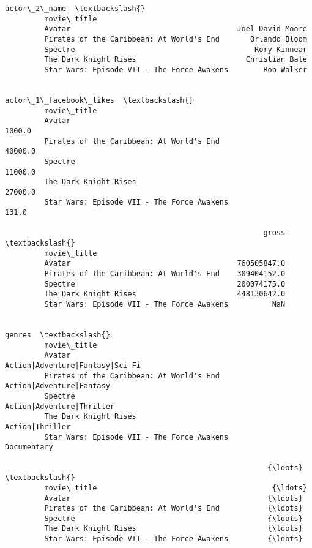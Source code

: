 \documentclass[11pt]{article}
\begin{document}
\begin{Verbatim}[commandchars=\\\{\}]
                                                         actor\_2\_name  \textbackslash{}
         movie\_title                                                    
         Avatar                                      Joel David Moore   
         Pirates of the Caribbean: At World's End       Orlando Bloom   
         Spectre                                         Rory Kinnear   
         The Dark Knight Rises                         Christian Bale   
         Star Wars: Episode VII - The Force Awakens        Rob Walker   
         
                                                     actor\_1\_facebook\_likes  \textbackslash{}
         movie\_title                                                          
         Avatar                                                      1000.0   
         Pirates of the Caribbean: At World's End                   40000.0   
         Spectre                                                    11000.0   
         The Dark Knight Rises                                      27000.0   
         Star Wars: Episode VII - The Force Awakens                   131.0   
         
                                                           gross  \textbackslash{}
         movie\_title                                               
         Avatar                                      760505847.0   
         Pirates of the Caribbean: At World's End    309404152.0   
         Spectre                                     200074175.0   
         The Dark Knight Rises                       448130642.0   
         Star Wars: Episode VII - The Force Awakens          NaN   
         
                                                                              genres  \textbackslash{}
         movie\_title                                                                   
         Avatar                                      Action|Adventure|Fantasy|Sci-Fi   
         Pirates of the Caribbean: At World's End           Action|Adventure|Fantasy   
         Spectre                                           Action|Adventure|Thriller   
         The Dark Knight Rises                                       Action|Thriller   
         Star Wars: Episode VII - The Force Awakens                      Documentary   
         
                                                            {\ldots}           \textbackslash{}
         movie\_title                                        {\ldots}            
         Avatar                                             {\ldots}            
         Pirates of the Caribbean: At World's End           {\ldots}            
         Spectre                                            {\ldots}            
         The Dark Knight Rises                              {\ldots}            
         Star Wars: Episode VII - The Force Awakens         {\ldots}            
         

\end{Verbatim}
\end{document}
